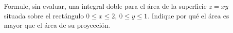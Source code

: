 Formule, sin evaluar, una integral doble para el área de la superficie $z=xy$ situada sobre el rectángulo $0\leq x\leq2$, $0\leq y\leq1$. Indique por qué el área es mayor que el área de su proyección.
